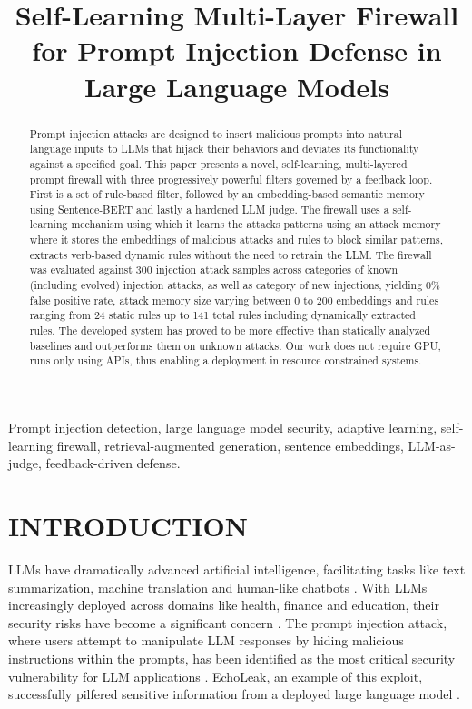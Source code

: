 \documentclass[10pt, conference, compsoc]{IEEEtran}
\title{Self-Learning Multi-Layer Firewall for Prompt Injection Defense in Large Language Models}
\author{
    \IEEEauthorblockN{Yash Yadav}
    \IEEEauthorblockA{\textit{Bennett University} \\
        yashhyadvv@gmail.com}
    \and
    \IEEEauthorblockN{Anshul Verma}
    \IEEEauthorblockA{\textit{Bennett University} \\
        anshul@gmail.com}
    \and
    \IEEEauthorblockN{Arpit Agarwal}
    \IEEEauthorblockA{\textit{Bennett University} \\
        arpit@gmail.com}
    \and
    \IEEEauthorblockN{Dr. Vijayant Pawar}
    \IEEEauthorblockA{\textit{Bennett University} \\
        vijayant@gmail.com}
}
\begin{document}
\maketitle

\begin{abstract}
Prompt injection attacks are designed to insert malicious prompts into natural language inputs to LLMs that hijack their behaviors and deviates its functionality against a specified goal. This paper presents a novel, self-learning, multi-layered prompt firewall with three progressively powerful filters governed by a feedback loop. First is a set of rule-based filter, followed by an embedding-based semantic memory using Sentence-BERT and lastly a hardened LLM judge. The firewall uses a self-learning mechanism using which it learns the attacks patterns using an attack memory where it stores the embeddings of malicious attacks and rules to block similar patterns, extracts verb-based dynamic rules without the need to retrain the LLM. The firewall was evaluated against 300 injection attack samples across categories of known (including evolved) injection attacks, as well as category of new injections, yielding 0\% false positive rate, attack memory size varying between 0 to 200 embeddings and rules ranging from 24 static rules up to 141 total rules including dynamically extracted rules. The developed system has proved to be more effective than statically analyzed baselines and outperforms them on unknown attacks. Our work does not require GPU, runs only using APIs, thus enabling a deployment in resource constrained systems.
\end{abstract}

\begin{IEEEkeywords}
Prompt injection detection, large language model security, adaptive learning, self-learning firewall, retrieval-augmented generation, sentence embeddings, LLM-as-judge, feedback-driven defense.
\end{IEEEkeywords}

\section{INTRODUCTION}

LLMs have dramatically advanced artificial intelligence, facilitating tasks like text summarization, machine translation and human-like chatbots \cite{naveed2025overview}. With LLMs increasingly deployed across domains like health, finance and education, their security risks have become a significant concern \cite{hadi2023largescale}. The prompt injection attack, where users attempt to manipulate LLM responses by hiding malicious instructions within the prompts, has been identified as the most critical security vulnerability for LLM applications \cite{owasp2023top10}. EchoLeak, an example of this exploit, successfully pilfered sensitive information from a deployed large language model \cite{reddy2025echoleak}.
\end{document}
